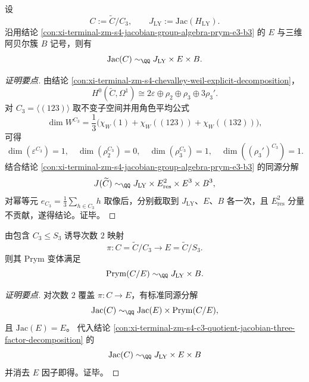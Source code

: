 \begin{conclusion}\label{con:xi-terminal-zm-s4-c3-quotient-jacobian-three-factor-decomposition}
设
\[
C:=\widetilde{C}/C_3,\qquad
J_{\mathrm{LY}}:=\mathrm{Jac}(H_{\mathrm{LY}}).
\]
沿用结论 \ref{con:xi-terminal-zm-s4-jacobian-group-algebra-prym-e3-b3} 的 \(E\) 与三维阿贝尔簇 \(B\) 记号，则有
\[
\mathrm{Jac}(C)\sim_{\QQ}J_{\mathrm{LY}}\times E\times B.
\]
\end{conclusion}
\begin{proof}[证明要点]
由结论 \ref{con:xi-terminal-zm-s4-chevalley-weil-explicit-decomposition}，
\[
H^0(\widetilde{C},\Omega^1)\cong 2\varepsilon\oplus \rho_2\oplus \rho_3\oplus 3\rho_3'.
\]
对 \(C_3=\langle(123)\rangle\) 取不变子空间并用角色平均公式
\[
\dim W^{C_3}=\frac{1}{3}\bigl(\chi_W(1)+\chi_W((123))+\chi_W((132))\bigr),
\]
可得
\[
\dim(\varepsilon^{C_3})=1,\quad
\dim(\rho_2^{C_3})=0,\quad
\dim(\rho_3^{C_3})=1,\quad
\dim((\rho_3')^{C_3})=1.
\]
结合结论 \ref{con:xi-terminal-zm-s4-jacobian-group-algebra-prym-e3-b3} 的同源分解
\[
J(\widetilde{C})\sim_{\QQ}J_{\mathrm{LY}}\times E_{\mathrm{res}}^2\times E^3\times B^3,
\]
对幂等元 \(e_{C_3}=\frac1{3}\sum_{h\in C_3}h\) 取像后，分别截取到
\(J_{\mathrm{LY}}\)、\(E\)、\(B\) 各一次，且 \(E_{\mathrm{res}}^2\) 分量不贡献，遂得结论。证毕。
\end{proof}

\begin{conclusion}\label{con:xi-terminal-zm-s4-c3-prym-leyang-equivalence}
由包含 \(C_3\le S_3\) 诱导次数 \(2\) 映射
\[
\pi:C=\widetilde{C}/C_3\longrightarrow E=\widetilde{C}/S_3.
\]
则其 Prym 变体满足
\[
\mathrm{Prym}(C/E)\sim_{\QQ}J_{\mathrm{LY}}\times B.
\]
\end{conclusion}
\begin{proof}[证明要点]
对次数 \(2\) 覆盖 \(\pi:C\to E\)，有标准同源分解
\[
\mathrm{Jac}(C)\sim_{\QQ}\mathrm{Jac}(E)\times \mathrm{Prym}(C/E),
\]
且 \(\mathrm{Jac}(E)=E\)。
代入结论 \ref{con:xi-terminal-zm-s4-c3-quotient-jacobian-three-factor-decomposition} 的
\[
\mathrm{Jac}(C)\sim_{\QQ}J_{\mathrm{LY}}\times E\times B
\]
并消去 \(E\) 因子即得。证毕。
\end{proof}

